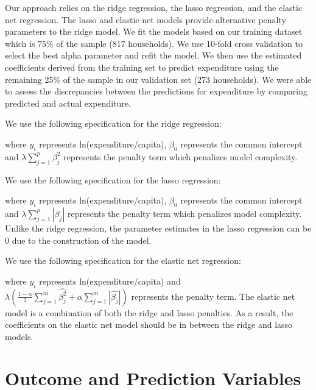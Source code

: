 \documentclass{article}
\begin{document}
Our approach relies on the ridge regression, the lasso regression, and the elastic net regression. The lasso and elastic net models provide alternative penalty parameters to the ridge model. We fit the models based on our training dataset which is 75\% of the sample (817 households).  We use 10-fold cross validation to select the best alpha parameter and refit the model. We then use the estimated coefficients derived from the training set to predict expenditure using the remaining 25\% of the sample in our validation set (273 households). We were able to assess the discrepancies between the predictions for expenditure by comparing predicted and actual expenditure.


We use the following specification for the ridge regression:





where $y_i$ represents ln(expenditure/capita), $\beta_0$ represents the common intercept and $\lambda\sum_{j=1}^p\beta_j^2$ represents the penalty term which penalizes model complexity. 

We use the following specification for the lasso regression:



where $y_i$ represents ln(expenditure/capita), $\beta_0$ represents the common intercept and $\lambda\sum_{j=1}^p|\beta_j|$ represents the penalty term which penalizes model complexity. Unlike the ridge regression, the parameter estimates in the lasso regression can be 0 due to the construction of the model. 

We use the following specification for the elastic net regression: 



where $y_i$ represents ln(expenditure/capita) and\\ $\lambda\left( \frac{1-\alpha}{2}\sum_{j=1}^m\hat{\beta^2_j}+\alpha\sum_{j=1}^m|\hat{\beta_j}|\right)$ represents the penalty term. The elastic net model is a combination of both the ridge and lasso penalties. As a result, the coefficients on the elastic net model should be in between the ridge and lasso models.

\section{Outcome and Prediction Variables}
\end{document}
